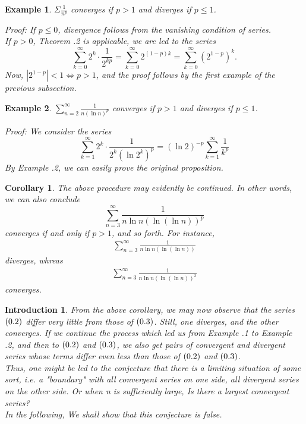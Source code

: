 \documentclass[12pt]{article}
\theoremstyle{oneline}
\newtheorem{corollary}{Corollary}[subsection]
\newtheorem{example}{Example}[subsection]
\theoremstyle{twoline}
\newtheorem{introduction}{Introduction}
\begin{document}
\begin{example}
  $\Sigma \frac1{n^p}$ converges if $p>1$ and diverges if $p\leq 1$.

\textit{Proof:} If $p\leq 0$, divergence follows from the vanishing condition of series. \\
If $p>0$, \textit{Theorem \thesubsection.2} is applicable, we are led to the series 
\[\sum\limits_{k=0}^{\infty}2^k\cdot\frac1{2^{kp}}=\sum\limits_{k=0}^{\infty}2^{(1-p)k}=\sum\limits_{k=0}^{\infty}(2^{1-p})^k.\]
Now, $|2^{1-p}|<1\iff p>1$, and the proof follows by the first example of the previous subsection.
\end{example}

\begin{example}
  $\sum\limits_{n=2}^{\infty} \frac1{n(\ln n)^p}$ converges if $p>1$ and diverges if $p\leq 1$.

\textit{Proof:} We consider the series 
\[\sum\limits_{k=1}^{\infty}2^k\cdot\frac1{2^k(\ln 2^k)^p}=(\ln 2)^{-p}\sum\limits_{k=1}^\infty\frac1{k^p}\]
By \textit{Example \thesubsection.2}, we can easily prove the original proposition.
\end{example}

\begin{corollary}
  The above procedure may evidently be continued. In other words, we can also conclude 
  \[\sum\limits_{n=3}^\infty\frac1{n\ln n(\ln(\ln n))^p}\] converges if and only if $p>1$, and so forth. For instance,
  \begin{align}
    \sum\limits_{n=3}^\infty\frac1{n\ln n(\ln(\ln n))} 
  \end{align}
  diverges, whreas
  \begin{align}
    \sum\limits_{n=3}^\infty\frac1{n\ln n(\ln(\ln n))^2}
  \end{align}
  converges.
\end{corollary}

\begin{introduction}
  \hspace*{2em}
  From the above corollary, we may now observe that the series $(\thesection.2)$ differ very little from those of $(\thesection.3)$. Still, one diverges, and the other converges. If we continue the process which led us from \textit{Example \thesubsection.1} to \textit{Example \thesubsection.2}, and then to $(\thesection.2)$ and $(\thesection.3)$, we also get pairs of convergent and divergent series whose terms differ even less than those of $(\thesection.2)$ and $(\thesection.3)$.\\
  \hspace*{2em}
  Thus, one might be led to the conjecture that there is a limiting situation of some sort, i.e. a "boundary" with all convergent series on one side, all divergent series on the other side.
  Or when n is sufficiently large, Is there a largest convergent series?\\
  \hspace*{2em}
  In the following, We shall show that this conjecture is false.
\end{introduction}
\end{document}
